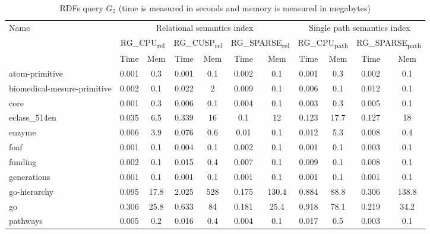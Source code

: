 {\setlength{\tabcolsep}{0.4em}
\begin{table*}[h]
\caption{RDFs query $G_2$ (time is measured in seconds and memory is measured in megabytes)}
\label{tbl:tableRDFQ2}
\begin{tabular}{| l | c  c | c  c | c  c | c  c | c  c |}
    \hline

    \multirow{3}{*}{Name}   &   \multicolumn{6}{|c|}{Relational semantics index}	&	\multicolumn{4}{|c|}{Single path semantics index} \\
    \cline{2-11}
    &	\multicolumn{2}{|c|}{RG\_CPU\textsubscript{rel}}	&	\multicolumn{2}{|c|}{RG\_CUSP\textsubscript{rel}}	&	\multicolumn{2}{|c|}{RG\_SPARSE\textsubscript{rel}} &	\multicolumn{2}{|c|}{RG\_CPU\textsubscript{path}}	&	\multicolumn{2}{|c|}{RG\_SPARSE\textsubscript{path}}	 \\
    \cline{2-11}
    &   Time & Mem &  Time     & Mem & Time     & Mem  &  Time     & Mem & Time     & Mem \\
    \hline
    \hline
    atom-primitive          & 0.001 & 0.3  & 0.001 & 0.1 & 0.002 & 0.1   & 0.001 & 0.3  & 0.002 & 0.1   \\
biomedical-mesure-primitive & 0.002 & 0.1  & 0.022 & 2   & 0.009 & 0.1   & 0.006 & 0.1  & 0.012 & 0.1   \\
core                        & 0.001 & 0.3  & 0.006 & 0.1 & 0.004 & 0.1   & 0.003 & 0.3  & 0.005 & 0.1   \\
eclass\_514en               & 0.035 & 6.5  & 0.339 & 16  & 0.1   & 12    & 0.123 & 17.7 & 0.127 & 18    \\
enzyme                      & 0.006 & 3.9  & 0.076 & 0.6 & 0.01  & 0.1   & 0.012 & 5.3  & 0.008 & 0.4   \\
foaf                        & 0.001 & 0.1  & 0.004 & 0.1 & 0.002 & 0.1   & 0.001 & 0.1  & 0.003 & 0.1   \\
funding                     & 0.002 & 0.1  & 0.015 & 0.4 & 0.007 & 0.1   & 0.009 & 0.1  & 0.008 & 0.1   \\
generations                 & 0.001 & 0.1  & 0.001 & 0.1 & 0.001 & 0.1   & 0.001 & 0.1  & 0.001 & 0.1   \\
go-hierarchy                & 0.095 & 17.8 & 2.025 & 528 & 0.175 & 130.4 & 0.884 & 88.8 & 0.306 & 138.8 \\
go                          & 0.306 & 25.8 & 0.633 & 84  & 0.181 & 25.4  & 0.918 & 78.1 & 0.219 & 34.2  \\
pathways                    & 0.005 & 0.2  & 0.016 & 0.4 & 0.004 & 0.1   & 0.017 & 0.5  & 0.003 & 0.1   \\

\end{tabular}
\end{table*}}
